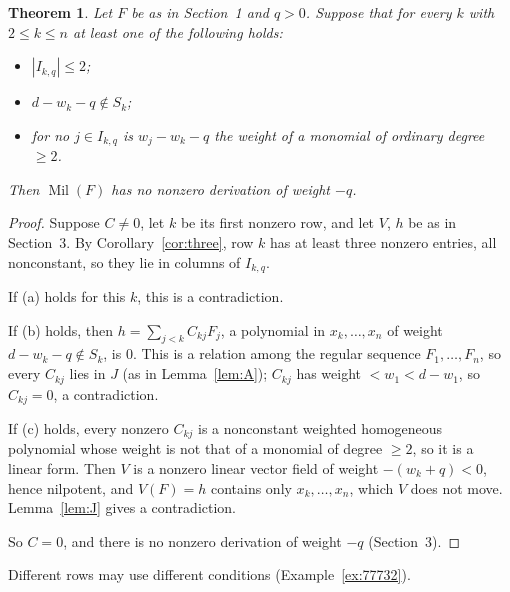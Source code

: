 \documentclass[11pt]{article}
\newcommand{\Mil}{\operatorname{Mil}(F)}
\newtheorem{theorem}{Theorem}[section]
\theoremstyle{remark}
\begin{document}
\begin{theorem}\label{thm:rows}
Let $F$ be as in Section~1 and $q>0$. Suppose that for every $k$ with $2\le k\le n$ at least one of the following holds:
\begin{itemize}
\item[(a)] $|I_{k,q}|\le2$;
\item[(b)] $d-w_k-q\notin S_k$;
\item[(c)] for no $j\in I_{k,q}$ is $w_j-w_k-q$ the weight of a monomial of ordinary degree $\ge2$.
\end{itemize}
Then $\Mil$ has no nonzero derivation of weight $-q$.
\end{theorem}

\begin{proof}
Suppose $C\ne0$, let $k$ be its first nonzero row, and let $V$, $h$ be as in Section~3. By Corollary~\ref{cor:three}, row $k$ has at least three nonzero entries, all nonconstant, so they lie in columns of $I_{k,q}$.

If (a) holds for this $k$, this is a contradiction.

If (b) holds, then $h=\sum_{j<k}C_{kj}F_j$, a polynomial in $x_k,\dots,x_n$ of weight $d-w_k-q\notin S_k$, is $0$. This is a relation among the regular sequence $F_1,\dots,F_n$, so every $C_{kj}$ lies in $J$ (as in Lemma~\ref{lem:A}); $C_{kj}$ has weight $<w_1<d-w_1$, so $C_{kj}=0$, a contradiction.

If (c) holds, every nonzero $C_{kj}$ is a nonconstant weighted homogeneous polynomial whose weight is not that of a monomial of degree $\ge2$, so it is a linear form. Then $V$ is a nonzero linear vector field of weight $-(w_k+q)<0$, hence nilpotent, and $V(F)=h$ contains only $x_k,\dots,x_n$, which $V$ does not move. Lemma~\ref{lem:J} gives a contradiction.

So $C=0$, and there is no nonzero derivation of weight $-q$ (Section~3).
\end{proof}

Different rows may use different conditions (Example~\ref{ex:77732}).
\end{document}
